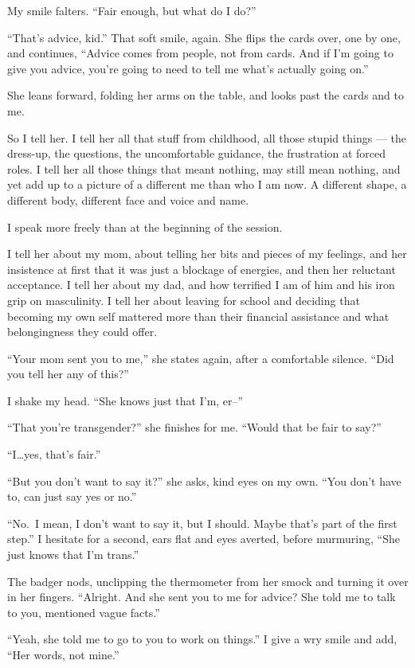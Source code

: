 My smile falters. ``Fair enough, but what do I do?''

``That's advice, kid.'' That soft smile, again. She flips the cards over, one by one, and continues, ``Advice comes from people, not from cards. And if I'm going to give you advice, you're going to need to tell me what's actually going on.''

She leans forward, folding her arms on the table, and looks past the cards and to me.

So I tell her. I tell her all that stuff from childhood, all those stupid things --- the dress-up, the questions, the uncomfortable guidance, the frustration at forced roles. I tell her all those things that meant nothing, may still mean nothing, and yet add up to a picture of a different me than who I am now. A different shape, a different body, different face and voice and name.

I speak more freely than at the beginning of the session.

I tell her about my mom, about telling her bits and pieces of my feelings, and her insistence at first that it was just a blockage of energies, and then her reluctant acceptance. I tell her about my dad, and how terrified I am of him and his iron grip on masculinity. I tell her about leaving for school and deciding that becoming my own self mattered more than their financial assistance and what belongingness they could offer.

``Your mom sent you to me,'' she states again, after a comfortable silence. ``Did you tell her any of this?''

I shake my head. ``She knows just that I'm, er--''

``That you're transgender?'' she finishes for me. ``Would that be fair to say?''

``I\ldots{}yes, that's fair.''

``But you don't want to say it?'' she asks, kind eyes on my own. ``You don't have to, can just say yes or no.''

``No.~I mean, I don't want to say it, but I should. Maybe that's part of the first step.'' I hesitate for a second, ears flat and eyes averted, before murmuring, ``She just knows that I'm trans.''

The badger nods, unclipping the thermometer from her smock and turning it over in her fingers. ``Alright. And she sent you to me for advice? She told me to talk to you, mentioned vague facts.''

``Yeah, she told me to go to you to work on things.'' I give a wry smile and add, ``Her words, not mine.''

